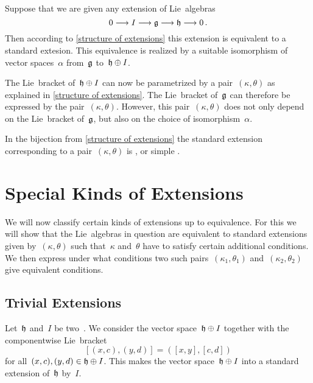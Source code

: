 \begin{warning}
  Suppose that we are given any extension of Lie~algebras
  \[
    0 \to I \to \glie \to \hlie \to 0 \,.
  \]
  Then according to \cref{structure of extensions} this extension is equivalent to a standard extesion.
  This equivalence is realized by a suitable isomorphism of vector spaces~$\alpha$ from~$\mathfrak{g}$ to~$\mathfrak{h} \oplus I$.

  The Lie~bracket of~$\mathfrak{h} \oplus I$ can now be parametrized by a pair~$(\kappa, \theta)$ as explained in \cref{structure of extensions}.
  The Lie~bracket of~$\mathfrak{g}$ can therefore be expressed by the pair~$(\kappa, \theta)$.
  However, this pair~$(\kappa, \theta)$ does not only depend on the Lie~bracket of~$\mathfrak{g}$, but also on the choice of isomorphism~$\alpha$.
\end{warning}


\begin{definition}
  In the bijection from \cref{structure of extensions} the standard extension corresponding to a pair~$(\kappa, \theta)$ is , or simple .
\end{definition}





\section{Special Kinds of Extensions}


\begin{fluff}
  We will now classify certain kinds of extensions up to equivalence.
  For this we will show that the Lie~algebras in question are equivalent to standard extensions given by~$(\kappa, \theta)$ such that~$\kappa$ and~$\theta$ have to satisfy certain additional conditions.
  We then express under what conditions two such pairs~$(\kappa_1, \theta_1)$ and~$(\kappa_2, \theta_2)$ give equivalent conditions.
\end{fluff}



\subsection{Trivial Extensions}


\begin{example}
  \label{construction of trivial extension}
  Let~$\mathfrak{h}$ and~$I$ be two~\liealgebras{$\kf$}.
  We consider the vector space~$\mathfrak{h} \oplus I$ together with the componentwise Lie~bracket
  \[
    [ (x,c), (y,d) ]
    =
    ( [x,y], [c,d] )
  \]
  for all~$(x,c), (y,d) \in \mathfrak{h} \oplus I$.
  This makes the vector space~$\mathfrak{h} \oplus I$ into a standard extension of~$\mathfrak{h}$ by~$I$.
\end{example}


